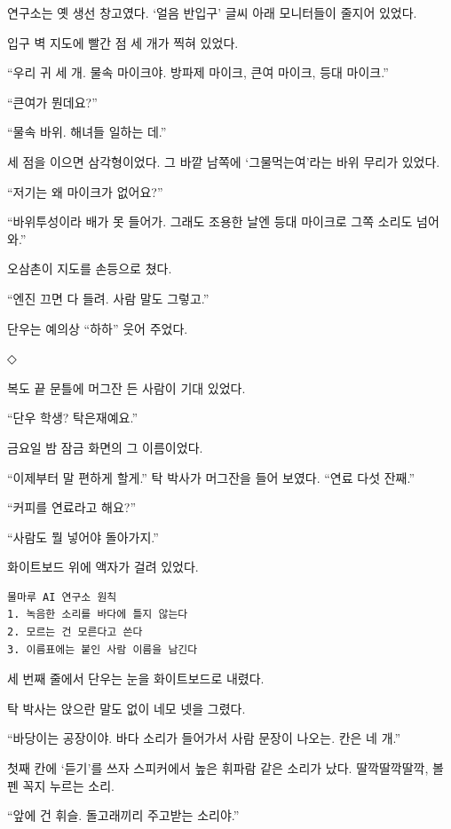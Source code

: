 \documentclass[
  korean,
  letterpaper,
  twoside,
  open=any,
  fontsize=12.5pt,
  headings=small]{scrbook}
\newcommand{\logfont}{\linespread{1}\fontsize{10.8}{15.2}\selectfont}
\begin{document}
연구소는 옛 생선 창고였다.
`얼음 반입구' 글씨 아래
모니터들이 줄지어 있었다.

입구 벽 지도에 빨간 점 세 개가
찍혀 있었다.

``우리 귀 세 개. 물속
마이크야. 방파제 마이크, 큰여
마이크, 등대 마이크.''

``큰여가 뭔데요?''

``물속 바위. 해녀들 일하는
데.''

세 점을 이으면 삼각형이었다.
그 바깥 남쪽에
`그물먹는여'라는 바위 무리가
있었다.

``저기는 왜 마이크가 없어요?''

``바위투성이라 배가 못 들어가.
그래도 조용한 날엔 등대
마이크로 그쪽 소리도 넘어와.''

오삼촌이 지도를 손등으로 쳤다.

``엔진 끄면 다 들려. 사람 말도
그렇고.''

단우는 예의상 ``하하'' 웃어
주었다.

\begin{center}◇\end{center}\nopagebreak

복도 끝 문틀에 머그잔 든
사람이 기대 있었다.

``단우 학생? 탁은재예요.''

금요일 밤 잠금 화면의 그
이름이었다.

``이제부터 말 편하게 할게.''
탁 박사가 머그잔을 들어
보였다. ``연료 다섯 잔째.''

``커피를 연료라고 해요?''

``사람도 뭘 넣어야 돌아가지.''

화이트보드 위에 액자가 걸려
있었다.

\begin{Verbatim}[samepage=true,frame=single,framesep=2.5mm,rulecolor=\color{gray},formatcom=\logfont]
물마루 AI 연구소 원칙
1. 녹음한 소리를 바다에 틀지 않는다
2. 모르는 건 모른다고 쓴다
3. 이름표에는 붙인 사람 이름을 남긴다
\end{Verbatim}

세 번째 줄에서 단우는 눈을
화이트보드로 내렸다.

탁 박사는 앉으란 말도 없이
네모 넷을 그렸다.

``바당이는 공장이야. 바다
소리가 들어가서 사람 문장이
나오는. 칸은 네 개.''

첫째 칸에 `듣기'를 쓰자
스피커에서 높은 휘파람 같은
소리가 났다. 딸깍딸깍딸깍,
볼펜 꼭지 누르는 소리.

``앞에 건 휘슬. 돌고래끼리
주고받는 소리야.''
\end{document}
